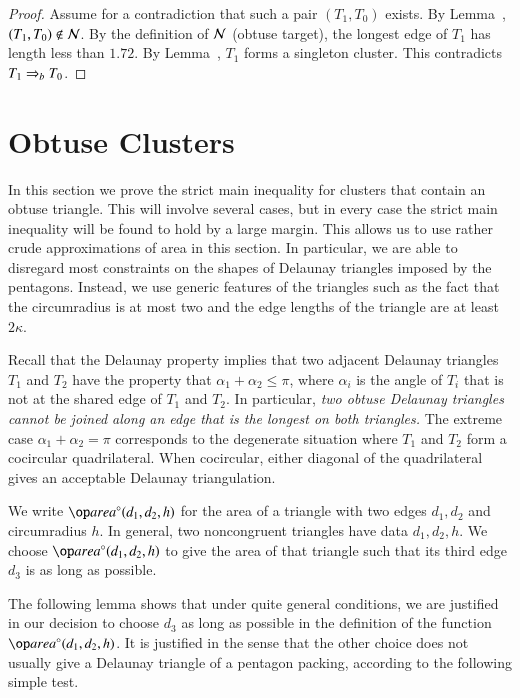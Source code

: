 \begin{proof}  
  Assume for a contradiction that such a pair $(T_1,T_0)$ exists.  By
  Lemma~, $(T_1,T_0)\not\in\mathcal N$.  By the definition of
  $\mathcal N$ (obtuse target), the longest edge of $T_1$ has length less than
  $1.72$.  By Lemma~, $T_1$ forms a singleton
  cluster.  This contradicts $T_1\Rightarrow_{b} T_0$.
\end{proof}


\section{Obtuse Clusters}

In this section we prove the strict main inequality for clusters that
contain an obtuse triangle.  This will involve several cases, but in
every case the strict main inequality will be found to hold by a large
margin.  This allows us to use rather crude approximations of
area in this section.  In particular, we are able to disregard most
constraints on the shapes of Delaunay triangles imposed by the
pentagons.  Instead, we use generic features of the triangles such as
the fact that the circumradius is at most two and the edge lengths of
the triangle are at least $2\kappa$.


\begin{remark}
  Recall that the Delaunay property implies that two adjacent Delaunay
  triangles $T_1$ and $T_2$ have the property that $\alpha_1 +
  \alpha_2\le \pi$, where $\alpha_i$ is the angle of $T_i$ that is not
  at the shared edge of $T_1$ and $T_2$.  In particular, {\it two
    obtuse Delaunay triangles cannot be joined along an edge that is
    the longest on both triangles.}  The extreme case
  $\alpha_1+\alpha_2=\pi$ corresponds to the degenerate situation
  where $T_1$ and $T_2$ form a cocircular quadrilateral. When
  cocircular, either diagonal of the quadrilateral gives an acceptable
  Delaunay triangulation.
\end{remark}



We write $\areta(d_1,d_2,h)$ for the area of a triangle with two edges
$d_1,d_2$ and circumradius $h$.  In general, two noncongruent
triangles have data $d_1,d_2,h$.  We choose $\areta(d_1,d_2,h)$ to
give the area of that triangle such that its third edge $d_3$ is as
long as possible.

The following lemma shows that under quite general
conditions, we are justified in our decision to choose $d_3$ as long
as possible in the definition of the function $\areta(d_1,d_2,h)$.  It
is justified in the sense that the other choice does not usually give
a Delaunay triangle of a pentagon packing, according to the following
simple test.

